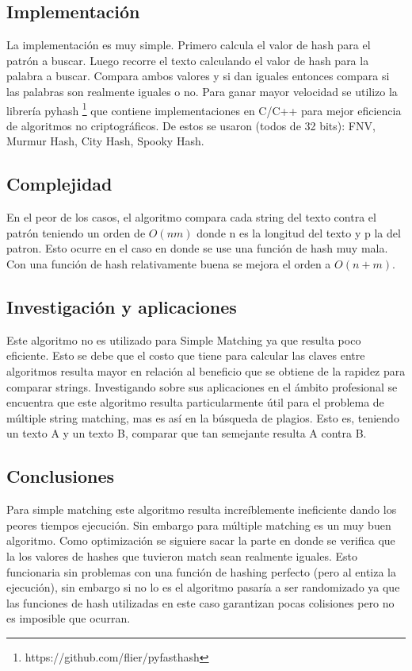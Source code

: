 \documentclass[a4paper, 10pt]{article}
\begin{document}
		\subsection{Implementación}
		
		La implementación es muy simple. Primero calcula el valor de hash para el patrón a buscar. Luego recorre el texto calculando el valor de hash para la palabra a buscar. Compara ambos valores y si dan iguales entonces compara si las palabras son realmente iguales o no. Para ganar mayor velocidad se utilizo la librería pyhash \footnote{https://github.com/flier/pyfasthash} que contiene implementaciones en C/C++ para mejor eficiencia de algoritmos no criptográficos. De estos se usaron (todos de 32 bits): FNV, Murmur Hash, City Hash, Spooky Hash.
		
		\subsection{Complejidad}
		
		En el peor de los casos, el algoritmo compara cada string del texto contra el patrón teniendo un orden de $O(nm)$ donde n es la longitud del texto y p la del patron. Esto ocurre en el caso en donde se use una función de hash muy mala. Con una función de hash relativamente buena se mejora el orden a $O(n+m)$.
		
		\subsection{Investigación y aplicaciones}
		
		Este algoritmo no es utilizado para Simple Matching ya que resulta poco eficiente. Esto se debe que  el costo que tiene para calcular las claves entre algoritmos resulta mayor en relación al beneficio que se obtiene de la rapidez para comparar strings. Investigando sobre sus aplicaciones en el ámbito profesional se encuentra que este algoritmo resulta particularmente útil para el problema de múltiple string matching, mas es así en la búsqueda de plagios. Esto es, teniendo un texto A y un texto B, comparar que tan semejante resulta A contra B.
		
		\subsection{Conclusiones}
		
		Para simple matching este algoritmo resulta increíblemente ineficiente dando los peores tiempos ejecución. Sin embargo para múltiple matching es un muy buen algoritmo. Como optimización se siguiere sacar la parte en donde se verifica que la los valores de hashes que tuvieron match sean realmente iguales. Esto funcionaria sin problemas con una función de hashing perfecto (pero al entiza la ejecución), sin embargo si no lo es el algoritmo pasaría a ser randomizado ya que las funciones de hash utilizadas en este caso garantizan pocas colisiones pero no es imposible que ocurran.    	
		
\end{document}
